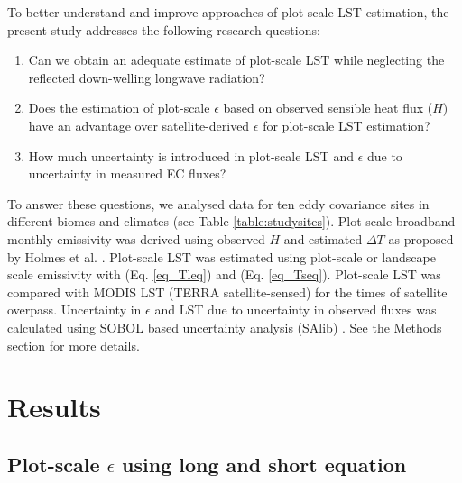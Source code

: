 \documentclass[fleqn,10pt]{wlscirep}
\begin{document}
To better understand and improve approaches of plot-scale LST estimation, the present study addresses the following research questions:
\begin{enumerate}
	\item Can we obtain an adequate estimate of plot-scale LST while neglecting the reflected down-welling longwave radiation?
	\item Does the estimation of plot-scale $\epsilon$ based on observed sensible heat flux ($H$) have an advantage over satellite-derived $\epsilon$ for plot-scale LST estimation?   
    \item How much uncertainty is introduced in plot-scale LST and $\epsilon$ due to uncertainty in measured EC fluxes?    
\end{enumerate}    

To answer these questions, we analysed data for ten eddy covariance sites in different biomes and climates (see Table \ref{table:studysites}).
Plot-scale broadband monthly emissivity was derived using observed $H$ and estimated $\Delta T$ as proposed by Holmes et al. \cite{holmes2009land}.  Plot-scale LST was estimated using plot-scale or landscape scale emissivity with (Eq. \ref{eq_Tleq}) and (Eq. \ref{eq_Tseq}). Plot-scale LST was compared with MODIS LST (TERRA satellite-sensed) for the times of satellite overpass. Uncertainty in $\epsilon$ and LST due to uncertainty in observed fluxes was calculated using SOBOL based uncertainty analysis (SAlib) \cite{rosolem2012fully}. See the Methods section for more details.

\section{Results}

\subsection{Plot-scale $\epsilon$ using long and short equation}
\end{document}
